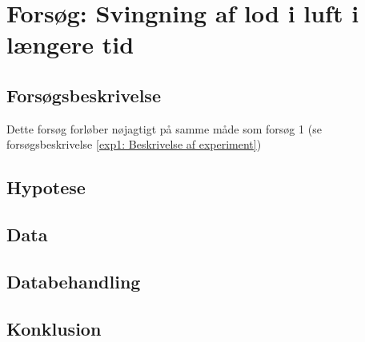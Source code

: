 \section{Forsøg: Svingning af lod i luft i længere tid}

\subsection{Forsøgsbeskrivelse}
Dette forsøg forløber nøjagtigt på samme måde som forsøg 1 (se forsøgsbeskrivelse \ref{exp1: Beskrivelse af experiment})


\subsection{Hypotese}

\subsection{Data}

\subsection{Databehandling}

\subsection{Konklusion}


